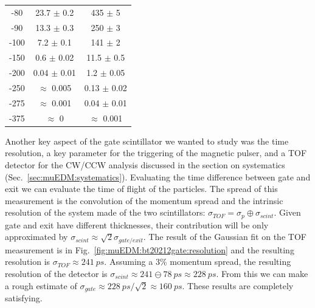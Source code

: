 \begin{refsection}
\begin{table}[ht]
\begin{minipage}{0.4\textwidth}
\begin{tabular}{|c|c|c|}
                -80 & 23.7 $\pm$ 0.2 & 435 $\pm$ 5 \\
                -90 & 13.3 $\pm$ 0.3 & 250 $\pm$ 3 \\
                -100 & 7.2 $\pm$ 0.1 & 141 $\pm$ 2 \\
                -150 & 0.6 $\pm$ 0.02 & 11.5 $\pm$ 0.5 \\
                -200 & 0.04 $\pm$ 0.01 & 1.2 $\pm$ 0.05 \\
                -250 & $\approx$ 0.005 & 0.13 $\pm$ 0.02 \\
                -275 & $\approx$ 0.001 & 0.04 $\pm$ 0.01 \\
                -375 & $\approx$ 0 & $\approx$ 0.001 \\
                \hline
                \end{tabular}
                \label{tab:muEDM:bt2022:gatenoise}
              \end{minipage}
            \end{table}

            \noindent
            Another key aspect of the gate scintillator we wanted to study was the time resolution, a key parameter for the triggering of the magnetic pulser, and a TOF detector for the CW/CCW analysis discussed in the section on systematics (Sec.~\ref{sec:muEDM:systematics}).
            Evaluating the time difference between gate and exit we can evaluate the time of flight of the particles. 
            The spread of this measurement is the convolution of the momentum spread and the intrinsic resolution of the system made of the two scintillators: $\sigma_{TOF} = \sigma_{p} \oplus \sigma_{scint}$.
            Given gate and exit have different thicknesses, their contribution will be only approximated by $\sigma_{scint}\approx\sqrt{2}\sigma_{gate/exit}$.
            The result of the Gaussian fit on the TOF measurement is in Fig.~\ref{fig:muEDM:bt20212gate:resolution} and the resulting resolution is $\sigma_{TOF} \approx \SI{241}{ps}$.
            Assuming a 3\% momentum spread, the resulting resolution of the detector is $\sigma_{scint}\approx 241 \ominus \SI{78}{ps} \approx \SI{228}{ps}$.
            From this we can make a rough estimate of $\sigma_{gate}\approx\SI{228}{ps}/\sqrt{2} \approx\SI{160}{ps}$.
            These results are completely satisfying.


\end{refsection}
